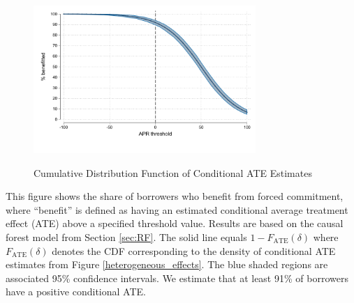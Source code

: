 \documentclass[oneside,11pt]{article}
\begin{document}
\cleardoublepage

\begin{figure}[H]
    \centering
  \caption{Cumulative Distribution Function of Conditional ATE Estimates}
  \includegraphics[width=0.75\textwidth]{Figuras/line_better_forceall_apr_te_cf.pdf} 
    \label{fig:CATEsurvival}
\end{figure}
 
This figure shows the share of borrowers who benefit from forced commitment, where ``benefit'' is defined as having an estimated conditional average treatment effect (ATE) above a specified threshold value. Results are based on the causal forest model from Section \ref{sec:RF}. The solid line equals $1 - F_\text{ATE}(\delta)$ where $F_\text{ATE}(\delta)$ denotes the CDF corresponding to the density of conditional ATE estimates from Figure \ref{heterogeneous_effects}. The blue shaded regions are associated 95\% confidence intervals. We estimate that at least 91\% of borrowers have a positive conditional ATE. 


  
\cleardoublepage
\end{document}
